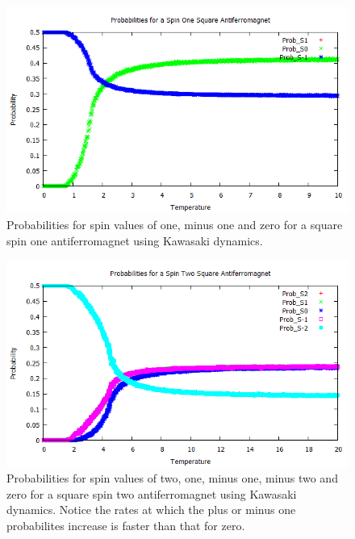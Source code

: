 \documentclass[]{article}
\begin{document}
\begin{figure}[h]
\begin{center}
\includegraphics[scale=0.75]{Spin_1}
\caption{Probabilities for spin values of one, minus one
 and zero for a square spin one antiferromagnet using
Kawasaki dynamics.}
\label{Spin_1}
\end{center}
\end{figure}

\begin{figure}[h]
\begin{center}
\includegraphics[scale=0.75]{Spin_2}
\caption{Probabilities for spin values of two, one, minus one, minus two and zero for a square spin two antiferromagnet using Kawasaki dynamics. Notice the rates at which the plus or minus one probabilites increase is faster than that for zero.}
\label{Spin_2}
\end{center}
\end{figure}
\end{document}

